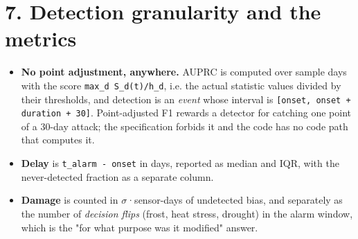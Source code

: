 \documentclass[10pt,a4paper]{article}
\begin{document}
\section*{7. Detection granularity and the metrics}
\begin{itemize}
\item \textbf{No point adjustment, anywhere.} AUPRC is computed over sample days with the
score \texttt{max\_\allowbreak{}d S\_\allowbreak{}d(t)/\allowbreak{}h\_\allowbreak{}d}, i.e. the actual statistic values divided by their thresholds, and detection is an \emph{event} whose interval is \texttt{[onset, onset + duration + 30]}. Point-\allowbreak{}adjusted F1 rewards a detector for catching one point of a 30-\allowbreak{}day attack; the specification forbids it and the code has no code path that computes it.

\item \textbf{Delay} is \texttt{t\_\allowbreak{}alarm -\allowbreak{} onset} in days, reported as median and IQR, with the
never-\allowbreak{}detected fraction as a separate column.

\item \textbf{Damage} is counted in $\sigma$·sensor-\allowbreak{}days of undetected bias, and separately as
the number of \emph{decision flips} (frost, heat stress, drought) in the alarm window, which is the "for what purpose was it modified" answer.

\end{itemize}
\end{document}
